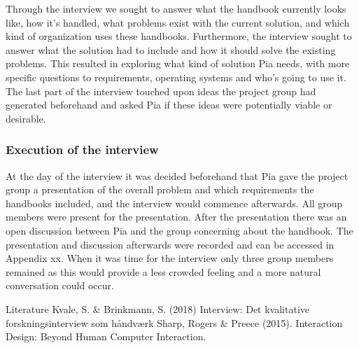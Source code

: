 Through the interview we sought to answer what the handbook currently looks like, how it’s handled, what problems exist with the current solution, and which kind of organization uses these handbooks. Furthermore, the interview sought to answer what the solution had to include and how it should solve the existing problems. This resulted in exploring what kind of solution Pia needs, with more specific questions to requirements, operating systems and who’s going to use it. The last part of the interview touched upon ideas the project group had generated beforehand and asked Pia if these ideas were potentially viable or desirable.

\subsubsection{Execution of the interview}

At the day of the interview it was decided beforehand that Pia gave the project group a presentation of the overall problem and which requirements the handbooks included, and the interview would commence afterwards. All group members were present for the presentation. After the presentation there was an open discussion between Pia and the group concerning about the handbook. The presentation and discussion afterwards were recorded and can be accessed in Appendix xx. When it was time for the interview only three group members remained as this would provide a less crowded feeling and a more natural conversation could occur.

Literature
 Kvale, S. \& Brinkmann, S.  (2018) Interview: Det kvalitative forskningsinterview som håndværk
Sharp, Rogers \& Preece (2015). Interaction Design: Beyond Human Computer Interaction.


